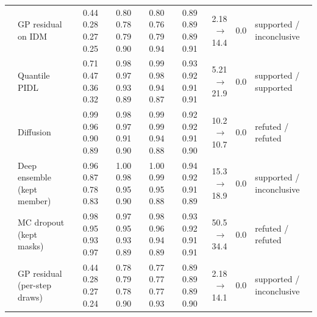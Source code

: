 \begin{table}[htbp]
\begin{tabular}{llrrrrrrl}
 & GP residual on IDM & 0.44 0.28 0.27 0.25 & 0.80 0.78 0.79 0.90 & 0.80 0.76 0.79 0.94 & 0.89 0.89 0.89 0.91 & 2.18 $\rightarrow$ 14.4 & 0.0 & supported / inconclusive \\
 & Quantile PIDL & 0.71 0.47 0.36 0.32 & 0.98 0.97 0.93 0.89 & 0.99 0.98 0.94 0.87 & 0.93 0.92 0.91 0.91 & 5.21 $\rightarrow$ 21.9 & 0.0 & supported / supported \\
 & Diffusion & 0.99 0.96 0.90 0.89 & 0.98 0.97 0.91 0.90 & 0.99 0.99 0.94 0.88 & 0.92 0.92 0.91 0.90 & 10.2 $\rightarrow$ 10.7 & 0.0 & refuted / refuted \\
 & Deep ensemble (kept member) & 0.96 0.87 0.78 0.83 & 1.00 0.98 0.95 0.90 & 1.00 0.99 0.95 0.88 & 0.94 0.92 0.91 0.89 & 15.3 $\rightarrow$ 18.9 & 0.0 & supported / inconclusive \\
 & MC dropout (kept masks) & 0.98 0.95 0.93 0.97 & 0.97 0.95 0.93 0.89 & 0.98 0.96 0.94 0.89 & 0.93 0.92 0.91 0.91 & 50.5 $\rightarrow$ 34.4 & 0.0 & refuted / refuted \\
 & GP residual (per-step draws) & 0.44 0.28 0.27 0.24 & 0.78 0.79 0.78 0.90 & 0.77 0.77 0.77 0.93 & 0.89 0.89 0.89 0.90 & 2.18 $\rightarrow$ 14.1 & 0.0 & supported / inconclusive \\
\bottomrule
\end{tabular}
\end{table}
